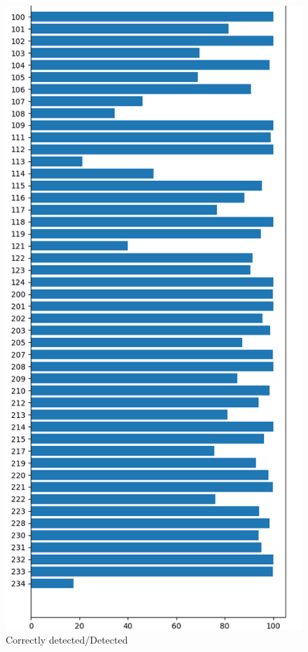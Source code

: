 \documentclass[conference]{IEEEtran}
\begin{document}
\begin{figure}[H]
\centerline{\includegraphics[scale=0.3]{imagenes/EfectividadDetectados}}
\caption{Correctly detected/Detected}
\label{fig}
\end{figure}
\end{document}
